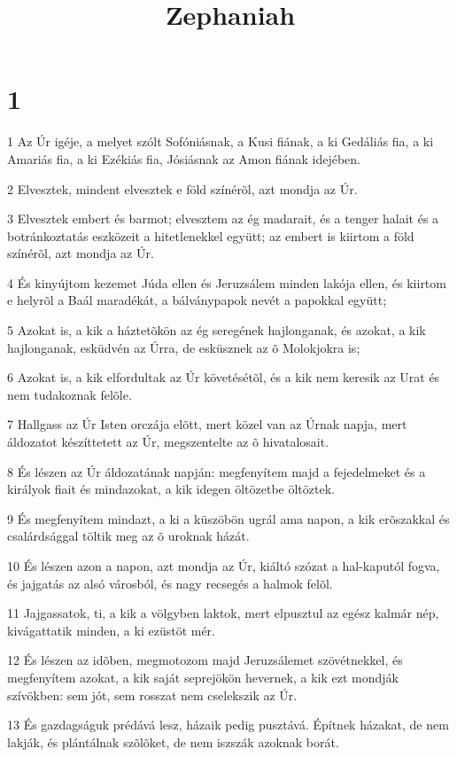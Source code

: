 

\title{Zephaniah}


\chapter{1}

\par 1 Az Úr igéje, a melyet szólt Sofóniásnak, a Kusi fiának, a ki Gedáliás fia, a ki Amariás fia, a ki Ezékiás fia, Jósiásnak az Amon fiának idejében.
\par 2 Elvesztek, mindent elvesztek e föld színérõl, azt mondja az Úr.
\par 3 Elvesztek embert és barmot; elvesztem az ég madarait, és a tenger halait és a botránkoztatás eszközeit a hitetlenekkel együtt; az embert is kiirtom a föld színérõl, azt mondja az Úr.
\par 4 És kinyújtom kezemet Júda ellen és Jeruzsálem minden lakója ellen, és kiirtom e helyrõl a Baál maradékát, a bálványpapok nevét a papokkal együtt;
\par 5 Azokat is, a kik a háztetõkön az ég seregének hajlonganak, és azokat, a kik hajlonganak, esküdvén az Úrra, de esküsznek az õ Molokjokra is;
\par 6 Azokat is, a kik elfordultak az Úr követésétõl, és a kik nem keresik az Urat és nem tudakoznak felõle.
\par 7 Hallgass az Úr Isten orczája elõtt, mert közel van az Úrnak napja, mert áldozatot készíttetett az Úr, megszentelte az õ hivatalosait.
\par 8 És lészen az Úr áldozatának napján: megfenyítem majd a fejedelmeket és a királyok fiait és mindazokat, a kik idegen öltözetbe öltöztek.
\par 9 És megfenyítem mindazt, a ki a küszöbön ugrál ama napon, a kik erõszakkal és csalárdsággal töltik meg az õ uroknak házát.
\par 10 És lészen azon a napon, azt mondja az Úr, kiáltó szózat a hal-kaputól fogva, és jajgatás az alsó városból, és nagy recsegés a halmok felõl.
\par 11 Jajgassatok, ti, a kik a völgyben laktok, mert elpusztul az egész kalmár nép, kivágattatik minden, a ki ezüstöt mér.
\par 12 És lészen az idõben, megmotozom majd Jeruzsálemet szövétnekkel, és megfenyítem azokat, a kik saját seprejökön hevernek, a kik ezt mondják szívökben: sem jót, sem rosszat nem cselekszik az Úr.
\par 13 És gazdagságuk prédává lesz, házaik pedig pusztává. Építnek házakat, de nem lakják, és plántálnak szõlõket, de nem iszszák azoknak borát.
